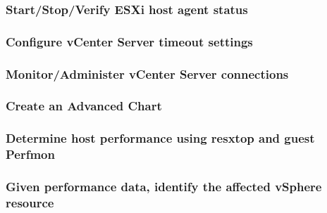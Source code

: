 \subsubsection{Start/Stop/Verify ESXi host agent status}

\subsubsection{Configure vCenter Server timeout settings}

\subsubsection{Monitor/Administer vCenter Server connections}

\subsubsection{Create an Advanced Chart}

\subsubsection{Determine host performance using resxtop and guest Perfmon}

\subsubsection{Given performance data, identify the affected vSphere resource}
